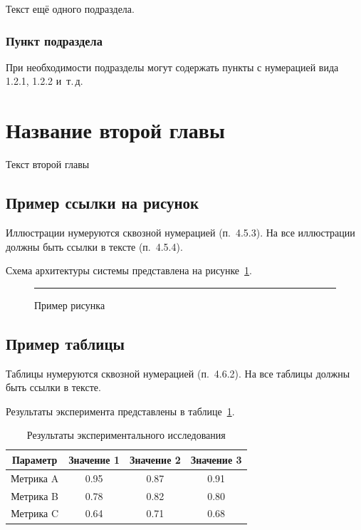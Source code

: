 \documentclass[a4paper,14pt]{extarticle}
\begin{document}
Текст ещё одного подраздела.

\subsubsection{Пункт подраздела}

При необходимости подразделы могут содержать пункты с нумерацией вида 1.2.1, 1.2.2 и~т.\,д.

\newpage

\section{Название второй главы}

Текст второй главы

\subsection{Пример ссылки на рисунок}

Иллюстрации нумеруются сквозной нумерацией (п.~4.5.3). На все иллюстрации должны быть ссылки в тексте (п.~4.5.4).

Схема архитектуры системы представлена на рисунке~\ref{fig:example}.

\begin{figure}[H]
  \centering
  \rule{0.6\textwidth}{4cm} %
  \caption{Пример рисунка}
  \label{fig:example}
\end{figure}

\subsection{Пример таблицы}

Таблицы нумеруются сквозной нумерацией (п.~4.6.2). На все таблицы должны быть ссылки в тексте.

Результаты эксперимента представлены в таблице~\ref{tab:results}.

\begin{table}[H]
\caption{Результаты экспериментального исследования}
\label{tab:results}
\centering
\begin{tabular}{|c|c|c|c|}
\hline
\textbf{Параметр} & \textbf{Значение 1} & \textbf{Значение 2} & \textbf{Значение 3} \\ \hline
Метрика A          & 0.95                & 0.87                & 0.91                \\ \hline
Метрика B          & 0.78                & 0.82                & 0.80                \\ \hline
Метрика C          & 0.64                & 0.71                & 0.68                \\ \hline
\end{tabular}
\end{table}
\end{document}
